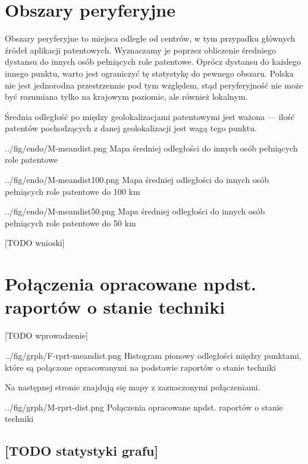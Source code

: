     \newpage\section
  {Obszary peryferyjne}

Obszary peryferyjne to miejsca odległe od centrów, w tym przypadku
głównych źródeł aplikacji patentowych. Wyznaczamy je poprzez obliczenie
średniego dystansu do innych osób pełniących role patentowe.
Oprócz dystansu do każdego innego punktu, warto jest ograniczyć
tę statystykę do pewnego obszaru. Polska nie jest jednorodna przestrzennie 
pod tym względem, stąd peryferyjność nie może być rozumiana tylko 
na krajowym poziomie, ale również lokalnym.

\begin{uwaga}
Średnia odległość po między geolokalizacjami patentowymi jest ważona ---
ilość patentów pochodzących z danej geolokalizacji jest wagą tego punktu.
\end{uwaga}

  \fig
{../fig/endo/M-meandist.png}
{ Mapa średniej odległości do innych osób pełniących role patentowe }

  \fig
{../fig/endo/M-meandist100.png}
{ Mapa średniej odległości do innych osób pełniących role patentowe do 100 km }

  \fig
{../fig/endo/M-meandist50.png}
{ Mapa średniej odległości do innych osób pełniących role patentowe do 50 km }


[TODO wnioski]




    \newpage\section
  {Połączenia opracowane npdst. raportów o stanie techniki}

[TODO wprowadzenie]

  \figside
{../fig/grph/F-rprt-meandist.png}
{ Histogram pionowy odległości między punktami, które są 
  połączone opracowanymi na podstawie raportów o stanie techniki }

Na następnej stronie znajdują się mapy z zaznaczonymi połączeniami.

\newpage

{../fig/grph/M-rprt-dist.png}
{ Połączenia opracowane npdst. raportów o stanie techniki }

\newpage


\subsection{[TODO statystyki grafu]}

